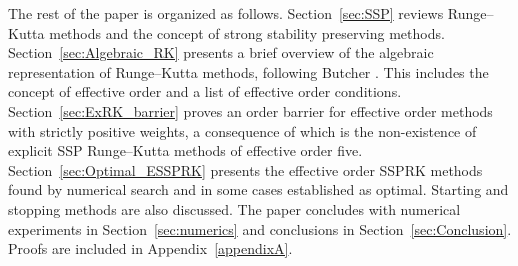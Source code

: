 The rest of the paper is organized as follows. Section~\ref{sec:SSP} reviews Runge--Kutta methods and the concept of strong stability preserving methods.  Section~\ref{sec:Algebraic_RK} presents a brief overview of the algebraic representation of Runge--Kutta methods, following Butcher \cite{Butcher2008_book}. This includes the concept of effective order and a list of effective order conditions. Section~\ref{sec:ExRK_barrier} proves an order barrier for effective order methods with strictly positive weights, a consequence of which is the non-existence of explicit SSP Runge--Kutta methods of effective order five. Section~\ref{sec:Optimal_ESSPRK} presents the effective order SSPRK methods found by numerical search and in some cases established as optimal. Starting and stopping methods are also discussed.
The paper concludes with numerical experiments in Section~\ref{sec:numerics} and conclusions in Section~\ref{sec:Conclusion}.
Proofs are included in Appendix~\ref{appendixA}.
